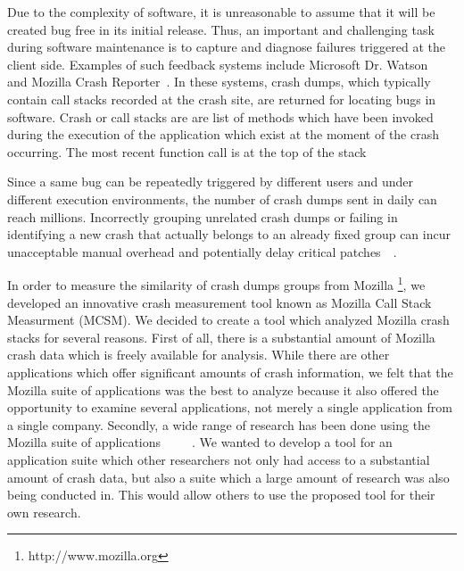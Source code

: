\documentclass{sig-alternate}
\begin{document}
Due to the complexity of software, it is unreasonable to assume that it will be created bug free in its initial release. Thus, an important and challenging task during software maintenance is to capture and diagnose failures triggered at the client side. Examples of such feedback systems include Microsoft Dr. Watson~\cite{drwatson} and Mozilla Crash Reporter~\cite{mozillacrashreporter}. In these systems, crash dumps, which typically contain call stacks recorded at the crash site, are returned for locating bugs in software. Crash or call stacks are are list of methods which have been invoked during the execution of the application which exist at the moment of the crash occurring. The most recent function call is at the top of the stack~\cite{raey}~\cite{Wang:2013:IBL:2487085.2487135}~\cite{Allwood:2009:FNS:1596638.1596654}~\cite{Seo:2012:PRC:2351676.2351702}





Since a same bug can be repeatedly triggered by different users and under different execution environments, the number of crash dumps sent in daily can reach millions. Incorrectly grouping unrelated crash dumps or failing in identifying a new crash that actually belongs to an already fixed group can incur unacceptable manual overhead and potentially delay critical patches~\cite{6498456}~\cite{Seo:2012:PRC:2351676.2351702}. 

In order to measure the similarity of crash dumps groups from Mozilla \footnote{http://www.mozilla.org}, we developed an innovative crash measurement tool known as Mozilla Call Stack Measurment (MCSM). We decided to create a tool which analyzed Mozilla crash stacks for several reasons. First of all, there is a substantial amount of Mozilla crash data which is freely available for analysis. While there are other applications which offer significant amounts of crash information, we felt that the Mozilla suite of applications was the best to analyze because it also offered the opportunity to examine several applications, not merely a single application from a single company. Secondly, a wide range of research has been done using the Mozilla suite of applications~\cite{Dhaliwal:2011:CFC:2117694.2119726}~\cite{5298423}~\cite{6224279}~\cite{5928673}~\cite{6224281}. We wanted to develop a tool for an application suite which other researchers not only had access to a substantial amount of crash data, but also a suite which a large amount of research was also being conducted in. This would allow others to use the proposed tool for their own research.
\end{document}
